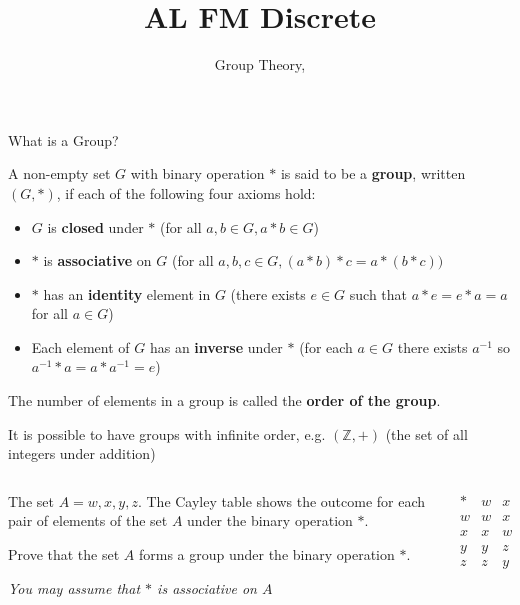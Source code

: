 \documentclass[8pt]{beamer}
\title[Pure]{{\color{aa}\Huge\adfbullet{9}}AL FM Discrete}
\subtitle{Group Theory, \textattachfile{GroupTheory.tex}{(TeX)}}
\begin{document}
\setlength{\abovedisplayskip}{0pt}
\setlength{\belowdisplayskip}{0pt}
\setlength{\abovedisplayshortskip}{0pt}
\setlength{\belowdisplayshortskip}{0pt}


\frame{\titlepage}

\begin{frame}[allowframebreaks]{What is a Group?}
	\begin{definition}
		A non-empty set $G$ with binary operation  $*$ is said to be a  \textbf{group}, written $(G,*)$, if each of the following four axioms hold:
		\begin{itemize}
			\item $G$ is  \textbf{closed} under  $*$ (for all  $a,b \in G, a*b \in G$)
			\item  $*$ is \textbf{associative} on  $G$  (for all $a,b,c\in G, (a*b)*c = a*(b*c))$ 
			\item $*$ has an \textbf{identity} element in  $G$ (there exists  $e \in G$ such that $a*e=e*a=a$ for all  $a\in G$)
			\item Each element of  $G$ has an  \textbf{inverse} under $*$ (for each  $a\in G$ there exists  $a^{-1}$ so  $a^{-1}*a=a*a^{-1}=e$)
		\end{itemize}
		
	\end{definition}
	
	\begin{definition}
	The number of elements in a group is called the \textbf{order of the group}. 
	\end{definition}

		It is possible to have groups with infinite order, e.g. $(\mathbb{Z},+)$ (the set of all integers under addition)
	\begin{columns}[T]
		
	\begin{column}{0.7\textwidth}
		\begin{Problem}
			The set $A={w,x,y,z}.$ The Cayley table shows the outcome for each pair of elements of the set  $A$ under the binary operation  $*$.

			Prove that the set  $A$ forms a group under the binary operation  $*$.

			 \emph{You may assume that $*$ is associative on $A$}
			
		 \end{Problem}
	\end{column}
	\begin{column}{0.3\textwidth}
		\begin{center}
		\colorbox{cc!30}{
			\setlength\arrayrulewidth{0.5mm}
$\begin{array}{c|cccc}
	* & w & x & y & z \\
	\hline
	w & w & x & y & z \\
	x & x & w & z & y \\
	y & y & z & x & w \\
	z & z & y & w & x \\
\end{array}$}
\end{center}


\end{column}
\end{columns}
\end{frame}
\end{document}
